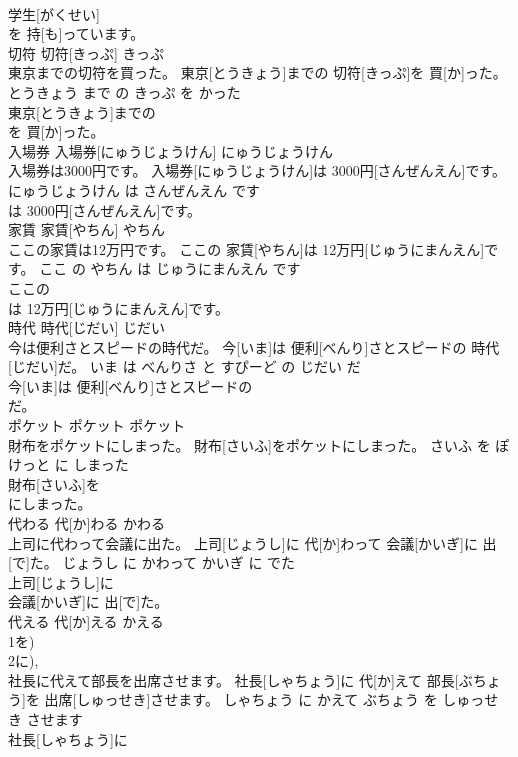 \documentclass[8pt]{extreport}
\begin{document}
\begin{CJK}{UTF8}{min}
\\	学生[がくせい]
\\	を 持[も]っています。		
\\	切符	切符[きっぷ]	きっぷ	
\\	東京までの切符を買った。	東京[とうきょう]までの 切符[きっぷ]を 買[か]った。	とうきょう まで の きっぷ を かった	
\\	東京[とうきょう]までの
\\	を 買[か]った。		
\\	入場券	入場券[にゅうじょうけん]	にゅうじょうけん	
\\	入場券は3000円です。	入場券[にゅうじょうけん]は 3000円[さんぜんえん]です。	にゅうじょうけん は さんぜんえん です	
\\	は 3000円[さんぜんえん]です。		
\\	家賃	家賃[やちん]	やちん	
\\	ここの家賃は12万円です。	ここの 家賃[やちん]は 12万円[じゅうにまんえん]です。	ここ の やちん は じゅうにまんえん です	
\\	ここの
\\	は 12万円[じゅうにまんえん]です。		
\\	時代	時代[じだい]	じだい	
\\	今は便利さとスピードの時代だ。	今[いま]は 便利[べんり]さとスピードの 時代[じだい]だ。	いま は べんりさ と すぴーど の じだい だ	
\\	今[いま]は 便利[べんり]さとスピードの
\\	だ。		
\\	ポケット	ポケット	ポケット	
\\	財布をポケットにしまった。	財布[さいふ]をポケットにしまった。	さいふ を ぽけっと に しまった	
\\	財布[さいふ]を
\\	にしまった。		
\\	代わる	代[か]わる	かわる	
\\	上司に代わって会議に出た。	上司[じょうし]に 代[か]わって 会議[かいぎ]に 出[で]た。	じょうし に かわって かいぎ に でた	
\\	上司[じょうし]に
\\	会議[かいぎ]に 出[で]た。		
\\	代える	代[か]える	かえる	
\\	1を) 
\\	2に), 
\\	社長に代えて部長を出席させます。	社長[しゃちょう]に 代[か]えて 部長[ぶちょう]を 出席[しゅっせき]させます。	しゃちょう に かえて ぶちょう を しゅっせき させます	
\\	社長[しゃちょう]に

\end{CJK}
\end{document}
